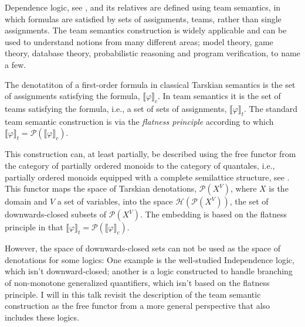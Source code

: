 \documentclass[bsl,meeting]{asl}
\newcommand{\NP}{}
\begin{document}
\thispagestyle{empty}


\NP  
{}


Dependence logic, see \cite{vaananen}, and its relatives are defined using team semantics, in which formulas are satisfied by sets of assignments, teams, rather than single assignments. 
The team semantics construction is widely applicable and can be used to
understand notions from many different areas; model theory, game theory,
database theory, probabilistic reasoning and program verification, to name a
few. 

The denotatiton of a first-order formula in classical Tarskian semantics is the set of assignments satisfying the formula, $\llbracket \varphi \rrbracket_c$. In team semantics it is the set of teams satisfying the formula, i.e., a set of sets of assignments, $\llbracket \varphi \rrbracket_t$. The standard team semantic construction is via the \emph{flatness principle} according to which $\llbracket \varphi \rrbracket_t = \mathcal P (\llbracket \varphi \rrbracket_c)$. 

This construction can, at least partially, be described using the free functor from the category of partially ordered monoids to the category of quantales, i.e., partially ordered monoids equipped with a complete semilattice structure, see \cite{abramsky}. This functor maps the space of Tarskian denotations, $\mathcal P (X^V)$, where $X$ is the domain and $V$ a set of variables, into the space $\mathcal H(\mathcal P(X^V))$, the set of downwards-closed subsets of $\mathcal P (X^V)$. The embedding is based on the flatness principle in that $\llbracket \varphi \rrbracket_t = \mathcal P (\llbracket \varphi \rrbracket_c)$. 

However, the space of downwards-closed sets can not be used as the space of denotations for some logics: One example is the well-studied Independence logic, which isn't downward-closed; another is a logic constructed to handle branching of non-monotone generalized quantifiers, which isn't based on the flatness principle. I will in this talk revisit the description of the team semantic construction as the free functor from a more general perspective that also includes  these logics.
\end{document}
